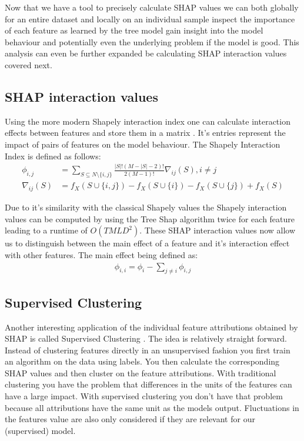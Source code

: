 \documentclass[conference]{IEEEtran}
\begin{document}
Now that we have a tool to precisely calculate SHAP values we can both globally for an entire dataset and locally on an individual sample inspect the importance of each feature as learned by the tree model gain insight into the model behaviour and potentially even the underlying problem if the model is good.
This analysis can even be further expanded be calculating SHAP interaction values covered next.

\subsection{SHAP interaction values}
Using the more modern Shapely interaction index \cite{b14} one can calculate interaction effects between features and store them in a matrix \cite{b1}. It's entries represent the impact of pairs of features on the model behaviour. The Shapely Interaction Index is defined as follows:\\
\begin{align}
\phi_{i,j} &= \sum_{S \subseteq N \setminus \{i, j\}} \frac{|S|!(M - |S| - 2)!}{2(M - 1)!}\nabla_{ij}(S), i\neq j \\
\nabla_{ij}(S) &= f_X(S \cup \{i,j\}) - f_X(S \cup \{i\}) - f_X(S \cup \{j\}) + f_X(S)
\end{align}

Due to it's similarity with the classical Shapely values the Shapely interaction values can be computed by using the Tree Shap algorithm twice for each feature leading to a runtime of $O(TMLD^2)$. These SHAP interaction values now allow us to distinguish between the main effect of a feature and it's interaction effect with other features. The main effect being defined as:
\begin{align}
\phi_{i,i} = \phi_i - \sum_{j \neq i} \phi_{i,j}
\end{align}


\subsection{Supervised Clustering}
Another interesting application of the individual feature attributions obtained by SHAP is called Supervised Clustering \cite{b1}. The idea is relatively straight forward. Instead of clustering features directly in an unsupervised fashion you first train an algorithm on the data using labels. You then calculate the corresponding SHAP values and then cluster on the feature attributions. With traditional clustering you have the problem that differences in the units of the features can have a large impact. With supervised clustering you don't have that problem because all attributions have the same unit as the models output. 
Fluctuations in the features value are also only considered if they are relevant for our (supervised) model.
\end{document}
